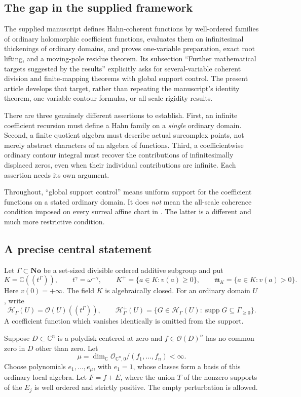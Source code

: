 \documentclass[11pt,letterpaper]{article}
\theoremstyle{definition}
\theoremstyle{remark}
\newcommand{\No}{\mathbf{No}}
\newcommand{\C}{\mathbb C}
\newcommand{\OO}{\mathcal O}
\newcommand{\HH}{\mathcal H}
\newcommand{\mm}{\mathfrak m}
\newcommand{\supp}{\operatorname{supp}}
\newcommand{\Kp}{K^{+}}
\newcommand{\Hp}{\HH^{+}_{\Gamma}}
\newcommand{\Hh}{\HH_{\Gamma}}
\begin{document}
\subsection{The gap in the supplied framework}
The supplied manuscript \cite{Supplied} defines Hahn-coherent functions by well-ordered families of ordinary holomorphic coefficient functions, evaluates them on infinitesimal thickenings of ordinary domains, and proves one-variable preparation, exact root lifting, and a moving-pole residue theorem. Its subsection ``Further mathematical targets suggested by the results'' explicitly asks for several-variable coherent division and finite-mapping theorems with global support control. The present article develops that target, rather than repeating the manuscript's identity theorem, one-variable contour formulas, or all-scale rigidity results.

There are three genuinely different assertions to establish. First, an infinite coefficient recursion must define a Hahn family on a \emph{single} ordinary domain. Second, a finite quotient algebra must describe actual surcomplex points, not merely abstract characters of an algebra of functions. Third, a coefficientwise ordinary contour integral must recover the contributions of infinitesimally displaced zeros, even when their individual contributions are infinite. Each assertion needs its own argument.

Throughout, ``global support control'' means uniform support for the coefficient functions on a stated ordinary domain. It does \emph{not} mean the all-scale coherence condition imposed on every surreal affine chart in \cite{Supplied}. The latter is a different and much more restrictive condition.

\subsection{A precise central statement}
Let $\Gamma\subset\No$ be a set-sized divisible ordered additive subgroup and put
\[
 K=\C((t^\Gamma)),\qquad t^\gamma=\omega^{-\gamma},\qquad
 \Kp=\{a\in K:v(a)\geq0\},\qquad
 \mm_K=\{a\in K:v(a)>0\}.
\]
Here $v(0)=+\infty$. The field $K$ is algebraically closed. For an ordinary domain $U$, write
\[
 \Hh(U)=\OO(U)((t^\Gamma)),\qquad
 \Hp(U)=\{G\in\Hh(U):\supp G\subseteq\Gamma_{\geq0}\}.
\]
A coefficient function which vanishes identically is omitted from the support.

Suppose $D\subset\C^n$ is a polydisk centered at zero and $f\in\OO(D)^n$ has no common zero in $D$ other than zero. Let
\[
 \mu=\dim_\C\OO_{\C^n,0}/(f_1,\ldots,f_n)<\infty.
\]
Choose polynomials $e_1,\ldots,e_\mu$, with $e_1=1$, whose classes form a basis of this ordinary local algebra. Let $F=f+E$, where the union $T$ of the nonzero supports of the $E_j$ is well ordered and strictly positive. The empty perturbation is allowed.
\end{document}
